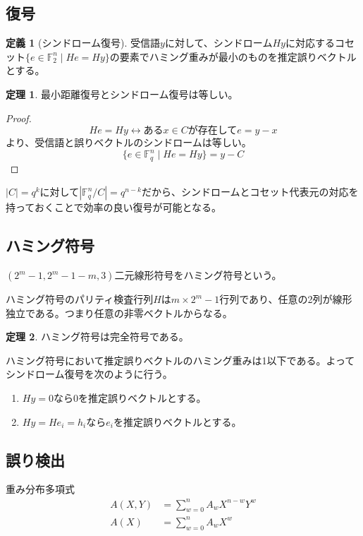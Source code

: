 \documentclass{jsarticle}
\newcommand{\F}{\mathbb{F}}
\renewcommand{\(}{\left(}
\renewcommand{\)}{\right)}
\theoremstyle{definition}
\newtheorem{dfn}{定義}
\newtheorem{thm}{定理}
\begin{document}
\subsection{復号}

\begin{dfn}[シンドローム復号]
    受信語$y$に対して、シンドローム$Hy$に対応するコセット$\{e \in \F_2^n \mid He = Hy\}$の要素でハミング重みが最小のものを推定誤りベクトルとする。
\end{dfn}

\begin{thm}
    最小距離復号とシンドローム復号は等しい。
\end{thm}
\begin{proof}
        \[He = Hy \leftrightarrow \text{ある$x \in C$が存在して$e = y - x$}\]
    より、受信語と誤りベクトルのシンドロームは等しい。
        \[\{e \in \F_q^n \mid He = Hy\} = y - C\]
\end{proof}
$|C| = q^k$に対して$|\F_q^n/C| = q^{n-k}$だから、シンドロームとコセット代表元の対応を持っておくことで効率の良い復号が可能となる。

\subsection{ハミング符号}

$(2^m - 1, 2^m - 1 - m, 3)$二元線形符号をハミング符号という。

ハミング符号のパリティ検査行列$H$は$m \times 2^m - 1$行列であり、任意の2列が線形独立である。つまり任意の非零ベクトルからなる。

\begin{thm}
    ハミング符号は完全符号である。
\end{thm}

ハミング符号において推定誤りベクトルのハミング重みは1以下である。よってシンドローム復号を次のように行う。
\begin{enumerate}
    \item $Hy = 0$なら$0$を推定誤りベクトルとする。
    \item $Hy = He_i = h_i$なら$e_i$を推定誤りベクトルとする。
\end{enumerate}

\subsection{誤り検出}

重み分布多項式
\begin{align*}
    A(X, Y) &= \sum_{w=0}^n A_wX^{n-w}Y^w\\
    A(X) &= \sum_{w=0}^n A_wX^w
\end{align*}
\end{document}
